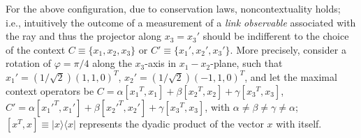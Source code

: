 \documentclass[prl,twocolumn,showpacs,showkeys,amsfonts]{revtex4}
\begin{document}
For the above configuration, due to conservation laws, noncontextuality holds;
i.e., intuitively the outcome of a measurement of
a {\em link observable} associated with the ray and thus the projector along $x_3=x_3'$
should be indifferent to the choice of the context
$C \equiv \{x_1,x_2,x_3\}$ or $C' \equiv \{x_1',x_2',x_3'\}$.
More precisely, consider
 a rotation of $\varphi = \pi /4$ along the $x_3$-axis in $x_1-x_2$-plane,
such that
$ {x_1'} = (1/\sqrt{2})(1,1,0)^T$,
$ {x_2'} = (1/\sqrt{2})(-1,1,0)^T$,
and let the  maximal context operators be
$
C =
\alpha
[{x_1}^T, {x_1}]
+
\beta
[{x_2}^T, {x_2}]
+
\gamma
[{x_3}^T, {x_3}]
$,
$
C' =
\alpha
[{x_1'}^T, {x_1'}]
+
\beta
[{x_2'}^T, {x_2'}]
+
\gamma
[{x_3}^T, {x_3}]
$,
with $\alpha \neq \beta \neq \gamma \neq \alpha$;
$[x^T,x]\equiv \vert x\rangle \langle x\vert$ represents the dyadic
product of the vector $x$ with itself.
\end{document}
